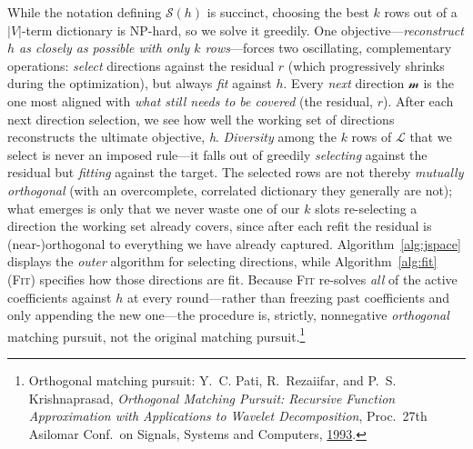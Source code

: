\documentclass{article}
\newcommand{\jlens}{\mathscr{L}}
\newcommand{\jspace}{\mathscr{S}}
\begin{document}
While the notation defining \(\jspace(h)\) is succinct, choosing the best \(k\) rows out of a \(|V|\)-term dictionary is NP-hard, so we solve it greedily. One objective---\textit{reconstruct \(h\) as closely as possible with only \(k\) rows}---forces two oscillating, complementary operations: \textit{select} directions against the residual \(r\) (which progressively shrinks during the optimization), but always \textit{fit} against \(h\). Every \textit{next} direction \(\mathscr{m}\) is the one most aligned with \textit{what still needs to be covered} (the residual, \(r\)). After each next direction selection, we see how well the working set of directions reconstructs the ultimate objective, \textit{h}. \textit{Diversity} among the \(k\) rows of \(\jlens\) that we select is never an imposed rule---it falls out of greedily \textit{selecting} against the residual but \textit{fitting} against the target. The selected rows are not thereby \textit{mutually orthogonal} (with an overcomplete, correlated dictionary they generally are not); what emerges is only that we never waste one of our \(k\) slots re-selecting a direction the working set already covers, since after each refit the residual is (near-)orthogonal to everything we have already captured. Algorithm~\ref{alg:jspace} displays the \textit{outer} algorithm for selecting directions, while Algorithm~\ref{alg:fit} (\textsc{Fit}) specifies how those directions are fit. Because \textsc{Fit} re-solves \textit{all} of the active coefficients against \(h\) at every round---rather than freezing past coefficients and only appending the new one---the procedure is, strictly, nonnegative \textit{orthogonal} matching pursuit, not the original matching pursuit.\footnote{Orthogonal matching pursuit: Y.~C. Pati, R.~Rezaiifar, and P.~S. Krishnaprasad, \textit{Orthogonal Matching Pursuit: Recursive Function Approximation with Applications to Wavelet Decomposition}, Proc.\ 27th Asilomar Conf.\ on Signals, Systems and Computers, \href{https://doi.org/10.1109/ACSSC.1993.342465}{1993}.}
\end{document}
